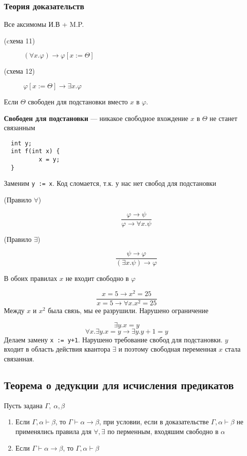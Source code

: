 \documentclass[english]{article}
\begin{document}
\subsubsection{Теория доказательств}
\label{sec:org3787295}
Все аксимомы И.В + M.P.
\begin{description}
	\item[{(cхема 11)}] \((\forall x. \varphi) \to \varphi[x:=\Theta]\)
	\item[{(схема 12)}] \(\varphi[x:=\Theta]\to \exists x. \varphi\)
\end{description}
Если \(\Theta\) свободен для подстановки вместо \(x\) в \(\varphi\).
\begin{definition}
	\textbf{Свободен для подстановки} --- никакое свободное вхождение \(x\) в \(\Theta\) не станет связанным
\end{definition}
\begin{examp}
	\-
	\begin{verbatim}
  int y;
  int f(int x) {
          x = y;
  }
\end{verbatim}
	Заменим \texttt{y := x}. Код сломается, т.к. у нас нет свобод для подстановки
\end{examp}
\begin{description}
	\item[{(Правило \(\forall\))}] \[\frac{\varphi \to \psi}{\varphi \to \forall x. \psi}\]
	\item[{(Правило \(\exists\))}] \[ \frac{\psi \to \varphi}{(\exists x.\psi) \to \varphi} \]
\end{description}
В обоих правилах \(x\) не входит свободно в \(\varphi\)
\begin{examp}
	\[ \frac{x = 5 \to x^2 = 25}{x = 5 \to \forall x. x^2 = 25} \]
	Между \(x\) и \(x^2\) была связь, мы ее разрушили. Нарушено ограничение
\end{examp}
\begin{examp}
	\[ \exists y. x = y \]
	\[ \forall x. \exists y. x = y \to \exists y. y + 1 = y \]
	Делаем замену \texttt{x := y+1}. Нарушено требование свобод для подстановки. \(y\) входит в область действия квантора \(\exists\) и поэтому свободная переменная \(x\) стала связанная.
\end{examp}
\subsection{Теорема о дедукции для исчисления предикатов}
\label{sec:org54aeef3}
\begin{theorem}
	Пусть задана \(\Gamma,\ \alpha,\beta\)
	\begin{enumerate}
		\item Если \(\Gamma, \alpha \vdash \beta\), то \(\Gamma \vdash \alpha \to \beta\), при условии, если в доказательстве \(\Gamma, \alpha \vdash \beta\) не применялись правила для \(\forall, \exists\) по перменным, входяшим свободно в \(\alpha\)
		\item Если \(\Gamma \vdash \alpha \to \beta\), то \(\Gamma, \alpha \vdash \beta\)
	\end{enumerate}
	\label{org9bc2177}
\end{theorem}
\end{document}
